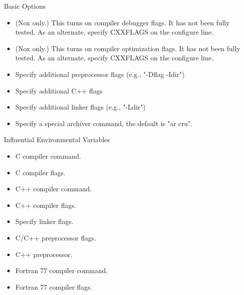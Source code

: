 \documentclass[12pt,relax]{TrilinosDevGuide}
\begin{document}
Basic Options

\begin{itemize}
\item {} 

(Nox only.)  This turns on compiler debugger flags. It has 
not been fully tested. As an alternate, specify CXXFLAGS on the 
                 configure line.

\item {}

(Nox only.)  This turns on compiler optimization flags. It 
has not been fully tested. As an alternate, specify CXXFLAGS on the 
                 configure line. 

\item {}

Specify additional preprocessor flags (e.g., "-Dflag -Idir") 

\item {}

Specify additional C++ flags 

\item {}

Specify additional linker flags (e.g., "-Ldir") 

\item {}

Specify a special archiver command, the default is "ar cru". 
\end{itemize}

 Influential Environmental Variables

\begin{itemize}
\item {}

C compiler command.

\item {}

C compiler flags.

\item {}

C++ compiler command.

\item {}

C++ compiler flags.

\item {}

Specify linker flags.

\item {}

C/C++ preprocessor flags.

\item {}

C++ preprocessor.

\item {}

Fortran 77 compiler command.

\item {}

Fortran 77 compiler flags.
\end{itemize}
\end{document}
